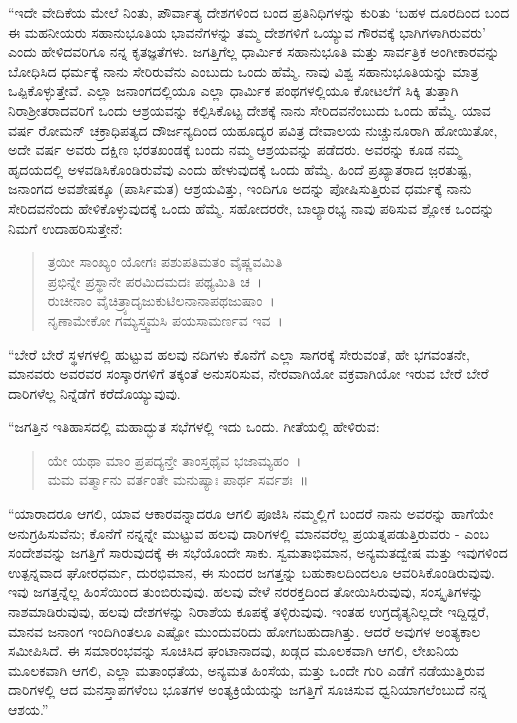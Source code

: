 “ಇದೇ ವೇದಿಕೆಯ ಮೇಲೆ ನಿಂತು, ಪೌರ್ವಾತ್ಯ ದೇಶಗಳಿಂದ ಬಂದ ಪ್ರತಿನಿಧಿಗಳನ್ನು ಕುರಿತು ‘ಬಹಳ ದೂರದಿಂದ ಬಂದ ಈ ಮಹನೀಯರು ಸಹಾನುಭೂತಿಯ ಭಾವನೆಗಳನ್ನು ತಮ್ಮ ದೇಶಗಳಿಗೆ ಒಯ್ಯುವ ಗೌರವಕ್ಕೆ ಭಾಗಿಗಳಾಗಿರುವರು’ ಎಂದು ಹೇಳಿದವರಿಗೂ ನನ್ನ ಕೃತಜ್ಞತೆಗಳು. ಜಗತ್ತಿಗೆಲ್ಲ ಧಾರ್ಮಿಕ ಸಹಾನುಭೂತಿ ಮತ್ತು ಸಾರ್ವತ್ರಿಕ ಅಂಗೀಕಾರವನ್ನು ಬೋಧಿಸಿದ ಧರ್ಮಕ್ಕೆ ನಾನು ಸೇರಿರುವೆನು ಎಂಬುದು ಒಂದು ಹೆಮ್ಮೆ. ನಾವು ವಿಶ್ವ ಸಹಾನುಭೂತಿಯನ್ನು ಮಾತ್ರ ಒಪ್ಪಿಕೊಳ್ಳುತ್ತೇವೆ. ಎಲ್ಲಾ ಜನಾಂಗದಲ್ಲಿಯೂ ಎಲ್ಲಾ ಧಾರ್ಮಿಕ ಪಂಥಗಳಲ್ಲಿಯೂ ಕೋಟಲೆಗೆ ಸಿಕ್ಕಿ ತುತ್ತಾಗಿ ನಿರಾಶ‍್ರೀತರಾದವರಿಗೆ ಒಂದು ಆಶ್ರಯವನ್ನು ಕಲ್ಪಿಸಿಕೊಟ್ಟ ದೇಶಕ್ಕೆ ನಾನು ಸೇರಿದವನೆಂಬುದು ಒಂದು ಹೆಮ್ಮೆ. ಯಾವ ವರ್ಷ ರೋಮನ್ ಚಕ್ರಾಧಿಪತ್ಯದ ದೌರ್ಜನ್ಯದಿಂದ ಯಹೂದ್ಯರ ಪವಿತ್ರ ದೇವಾಲಯ ನುಚ್ಚುನೂರಾಗಿ ಹೋಯಿತೋ, ಅದೇ ವರ್ಷ ಅವರು ದಕ್ಷಿಣ ಭರತಖಂಡಕ್ಕೆ ಬಂದು ನಮ್ಮ ಆಶ್ರಯವನ್ನು ಪಡೆದರು. ಅವರನ್ನು ಕೂಡ ನಮ್ಮ ಹೃದಯದಲ್ಲಿ ಅಳವಡಿಸಿಕೊಂಡಿರುವೆವು ಎಂದು ಹೇಳುವುದಕ್ಕೆ ಒಂದು ಹೆಮ್ಮೆ. ಹಿಂದೆ ಪ್ರಖ್ಯಾತರಾದ ಜ಼ರತುಷ್ಟ, ಜನಾಂಗದ ಅವಶೇಷಕ್ಕೂ (ಪಾರ್ಸಿಮತ) ಆಶ್ರಯವಿತ್ತು, ಇಂದಿಗೂ ಅದನ್ನು ಪೋಷಿಸುತ್ತಿರುವ ಧರ್ಮಕ್ಕೆ ನಾನು ಸೇರಿದವನೆಂದು ಹೇಳಿಕೊಳ್ಳುವುದಕ್ಕೆ ಒಂದು ಹೆಮ್ಮೆ. ಸಹೋದರರೇ, ಬಾಲ್ಯಾರಭ್ಯ ನಾವು ಪಠಿಸುವ ಶ್ಲೋಕ ಒಂದನ್ನು ನಿಮಗೆ ಉದಾಹರಿಸುತ್ತೇನೆ:

\begin{verse}
ತ್ರಯೀ ಸಾಂಖ್ಯಂ ಯೋಗಃ ಪಶುಪತಿಮತಂ ವೈಷ್ಣವಮಿತಿ\\ಪ್ರಭಿನ್ನೇ ಪ್ರಸ್ಥಾನೇ ಪರಮಿದಮದಃ ಪಥ್ಯಮಿತಿ ಚ~।\\ರುಚೀನಾಂ ವೈಚಿತ್ರ್ಯಾದೃಜುಕುಟಿಲನಾನಾಪಥಜುಷಾಂ~।\\ನೃಣಾಮೇಕೋ ಗಮ್ಯಸ್ತ್ವಮಸಿ ಪಯಸಾಮರ್ಣವ ಇವ~।
\end{verse}

“ಬೇರೆ ಬೇರೆ ಸ್ಥಳಗಳಲ್ಲಿ ಹುಟ್ಟುವ ಹಲವು ನದಿಗಳು ಕೊನೆಗೆ ಎಲ್ಲಾ ಸಾಗರಕ್ಕೆ ಸೇರುವಂತೆ, ಹೇ ಭಗವಂತನೇ, ಮಾನವರು ಅವರವರ ಸಂಸ್ಕಾರಗಳಿಗೆ ತಕ್ಕಂತೆ ಅನುಸರಿಸುವ, ನೇರವಾಗಿಯೋ ವಕ್ರವಾಗಿಯೋ ಇರುವ ಬೇರೆ ಬೇರೆ ದಾರಿಗಳೆಲ್ಲ ನಿನ್ನೆಡೆಗೆ ಕರೆದೊಯ್ಯುವುವು.

 “ಜಗತ್ತಿನ ಇತಿಹಾಸದಲ್ಲಿ ಮಹಾದ್ಭುತ ಸಭೆಗಳಲ್ಲಿ ಇದು ಒಂದು. ಗೀತೆಯಲ್ಲಿ ಹೇಳಿರುವ:

\begin{verse}
ಯೇ ಯಥಾ ಮಾಂ ಪ್ರಪದ್ಯನ್ತೇ ತಾಂಸ್ತಥೈವ ಭಜಾಮ್ಯಹಂ~।\\ಮಮ ವರ್ತ್ಮಾನು ವರ್ತಂತೇ ಮನುಷ್ಯಾಃ ಪಾರ್ಥ ಸರ್ವಶಃ~॥
\end{verse}

“ಯಾರಾದರೂ ಆಗಲಿ, ಯಾವ ಆಕಾರವನ್ನಾದರೂ ಆಗಲಿ ಪೂಜಿಸಿ ನಮ್ಮಲ್ಲಿಗೆ ಬಂದರೆ ನಾನು ಅವರನ್ನು ಹಾಗೆಯೇ ಅನುಗ್ರಹಿಸುವೆನು; ಕೊನೆಗೆ ನನ್ನನ್ನೇ ಮುಟ್ಟುವ ಹಲವು ದಾರಿಗಳಲ್ಲಿ ಮಾನವರೆಲ್ಲ ಪ್ರಯತ್ನಪಡುತ್ತಿರುವರು - ಎಂಬ ಸಂದೇಶವನ್ನು ಜಗತ್ತಿಗೆ ಸಾರುವುದಕ್ಕೆ ಈ ಸಭೆಯೊಂದೇ ಸಾಕು. ಸ್ವಮತಾಭಿಮಾನ, ಅನ್ಯಮತದ್ವೇಷ ಮತ್ತು ಇವುಗಳಿಂದ ಉತ್ಪನ್ನವಾದ ಘೋರಧರ್ಮ, ದುರಭಿಮಾನ, ಈ ಸುಂದರ ಜಗತ್ತನ್ನು ಬಹುಕಾಲದಿಂದಲೂ ಆವರಿಸಿಕೊಂಡಿರುವುವು. ಇವು ಜಗತ್ತನ್ನೆಲ್ಲ ಹಿಂಸೆಯಿಂದ ತುಂಬಿರುವುವು. ಹಲವು ವೇಳೆ ನರರಕ್ತದಿಂದ ತೋಯಿಸಿರುವುವು, ಸಂಸ್ಕೃತಿಗಳನ್ನು ನಾಶಮಾಡಿರುವುವು, ಹಲವು ದೇಶಗಳನ್ನು ನಿರಾಶೆಯ ಕೂಪಕ್ಕೆ ತಳ್ಳಿರುವುವು. ಇಂತಹ ಉಗ್ರದೈತ್ಯನಿಲ್ಲದೇ ಇದ್ದಿದ್ದರೆ, ಮಾನವ ಜನಾಂಗ ಇಂದಿಗಿಂತಲೂ ಎಷ್ಟೋ ಮುಂದುವರಿದು ಹೋಗಬಹುದಾಗಿತ್ತು. ಆದರೆ ಅವುಗಳ ಅಂತ್ಯಕಾಲ ಸಮೀಪಿಸಿದೆ. ಈ ಸಮಾರಂಭವನ್ನು ಸೂಚಿಸಿದ ಘಂಟಾನಾದವು, ಖಡ್ಗದ ಮೂಲಕವಾಗಿ ಆಗಲಿ, ಲೇಖನಿಯ ಮೂಲಕವಾಗಿ ಆಗಲಿ, ಎಲ್ಲಾ ಮತಾಂಧತೆಯ, ಅನ್ಯಮತ ಹಿಂಸೆಯ, ಮತ್ತು ಒಂದೇ ಗುರಿ ಎಡೆಗೆ ನಡೆಯುತ್ತಿರುವ ದಾರಿಗಳಲ್ಲಿ ಆದ ಮನಸ್ತಾಪಗಳೆಂಬ ಭೂತಗಳ ಅಂತ್ಯಕ್ರಿಯೆಯನ್ನು ಜಗತ್ತಿಗೆ ಸೂಚಿಸುವ ಧ್ವನಿಯಾಗಲೆಂಬುದೆ ನನ್ನ ಆಶಯ.”

